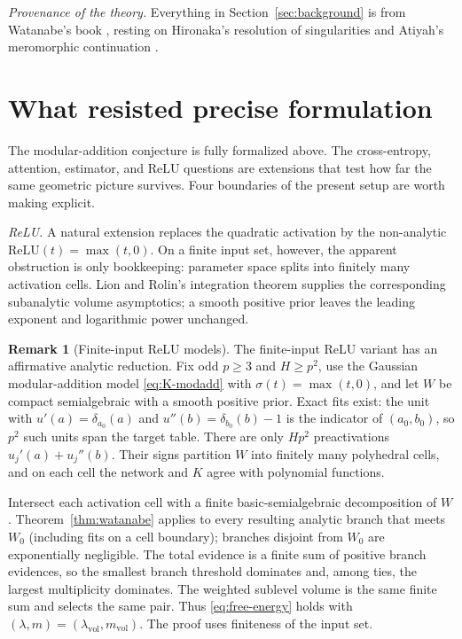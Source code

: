 \documentclass[11pt]{amsart}
\theoremstyle{plain}
\theoremstyle{definition}
\newtheorem{remark}[theorem]{Remark}
\DeclareMathOperator{\vol}{vol}
\begin{document}
\emph{Provenance of the theory.} Everything in Section~\ref{sec:background} is from Watanabe's book \cite{watanabe2009}, resting on Hironaka's resolution of singularities \cite{hironaka1964} and Atiyah's meromorphic continuation \cite{atiyah1970}.

\section{What resisted precise formulation}\label{sec:resisted}

The modular-addition conjecture is fully formalized above. The cross-entropy, attention, estimator, and ReLU questions are extensions that test how far the same geometric picture survives. Four boundaries of the present setup are worth making explicit.

\emph{ReLU.} A natural extension replaces the quadratic activation by the non-analytic $\mathrm{ReLU}(t)=\max(t,0)$. On a finite input set, however, the apparent obstruction is only bookkeeping: parameter space splits into finitely many activation cells. Lion and Rolin's integration theorem \cite{lion1998} supplies the corresponding subanalytic volume asymptotics; a smooth positive prior leaves the leading exponent and logarithmic power unchanged.

\begin{remark}[Finite-input ReLU models]
The finite-input ReLU variant has an affirmative analytic reduction. Fix odd $p\ge3$ and $H\ge p^2$, use the Gaussian modular-addition model \eqref{eq:K-modadd} with $\sigma(t)=\max(t,0)$, and let $W$ be compact semialgebraic with a smooth positive prior. Exact fits exist: the unit with $u'(a)=\delta_{a_0}(a)$ and $u''(b)=\delta_{b_0}(b)-1$ is the indicator of $(a_0,b_0)$, so $p^2$ such units span the target table. There are only $Hp^2$ preactivations $u_j'(a)+u_j''(b)$. Their signs partition $W$ into finitely many polyhedral cells, and on each cell the network and $K$ agree with polynomial functions.

Intersect each activation cell with a finite basic-semialgebraic decomposition of $W$. Theorem~\ref{thm:watanabe} applies to every resulting analytic branch that meets $W_0$ (including fits on a cell boundary); branches disjoint from $W_0$ are exponentially negligible. The total evidence is a finite sum of positive branch evidences, so the smallest branch threshold dominates and, among ties, the largest multiplicity dominates. The weighted sublevel volume is the same finite sum and selects the same pair. Thus \eqref{eq:free-energy} holds with $(\lambda,m)=(\lambda_{\vol},m_{\vol})$. The proof uses finiteness of the input set.
\end{remark}
\end{document}
